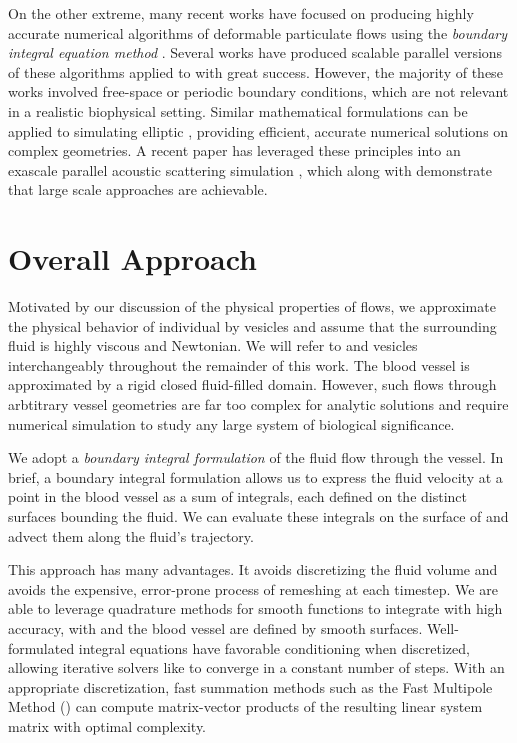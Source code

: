 On the other extreme, many recent works have focused on producing highly accurate numerical algorithms of deformable particulate flows using the \textit{boundary integral equation method} \cite{Veerapaneni2009b,Veerapaneni2011,rahimian2015,sorgentone2018highly,sorgentone20193d,af2016fast,Zhao2010}.
Several works \cite{lu2018parallel,Malhotra2017,rahimian2010petascale} have produced scalable parallel versions of these algorithms applied to \rbcs with great success.
However, the majority of these works involved free-space or periodic boundary conditions, which are not relevant in a realistic biophysical setting.
Similar mathematical formulations can be applied to simulating elliptic \pdes \cite{YBZ,wala20183d,wala2018optimization,bruno2013high}, providing efficient, accurate numerical solutions on complex geometries.
A recent paper has leveraged these principles into an exascale parallel acoustic scattering simulation \cite{abduljabbar2019extreme}, which along with \cite{rahimian2010petascale} demonstrate that large scale \bie approaches are achievable.

\section{Overall Approach}
Motivated by our discussion of the physical properties of \rbc flows, we approximate the physical behavior of individual \rbcs by vesicles and assume that the surrounding fluid is highly viscous and Newtonian.
We will refer to \rbcs and vesicles interchangeably throughout the remainder of this work.
The blood vessel is approximated by a rigid closed fluid-filled domain. 
However, such flows through arbtitrary vessel geometries are far too complex for analytic solutions and require numerical simulation to study any large system of biological significance.

We adopt a \textit{boundary integral formulation} of the fluid flow through the vessel.
In brief, a boundary integral formulation allows us to express the fluid velocity at a point in the blood vessel as a sum of integrals, each defined on the distinct surfaces bounding the fluid.
We can evaluate these integrals on the surface of \rbcs and advect them along the fluid's trajectory. 

This approach has many advantages. 
It avoids discretizing the fluid volume and avoids the expensive, error-prone process of remeshing at each timestep.
We are able to leverage quadrature methods for smooth functions to integrate with high accuracy, with \rbcs and the blood vessel are defined by smooth surfaces.
Well-formulated integral equations have favorable conditioning when discretized, allowing iterative solvers like \gmres to converge in a constant number of steps.
With an appropriate discretization, fast summation methods such as the Fast Multipole Method (\fmm) can compute matrix-vector products of the resulting linear system matrix with optimal complexity.

